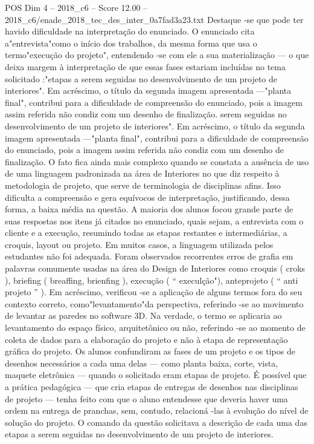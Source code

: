\begin{textsample}{POS Dim 4 – 2018\_c6 – Score 12.00 – 2018\_c6/enade\_2018\_tec\_des\_inter\_0a7fad3a23.txt}
Destaque -se que pode ter havido dificuldade na interpretação do enunciado.
O enunciado cita a"entrevista"como o início dos trabalhos, da mesma forma que usa o termo"execução do projeto", entendendo -se com ele a sua materialização — o que deixa margem à interpretação de que essas fases estariam incluídas no tema solicitado :"etapas a serem seguidas no desenvolvimento de um projeto de interiores".
Em acréscimo, o título da segunda imagem apresentada —"planta final", contribui para a dificuldade de compreensão do enunciado, pois a imagem assim referida não condiz com um desenho de finalização. serem seguidas no desenvolvimento de um projeto de interiores".
Em acréscimo, o título da segunda imagem apresentada —"planta final", contribui para a dificuldade de compreensão do enunciado, pois a imagem assim referida não condiz com um desenho de finalização.
O fato fica ainda mais complexo quando se constata a ausência de uso de uma linguagem padronizada na área de Interiores no que diz respeito à metodologia de projeto, que serve de terminologia de disciplinas afins.
Isso dificulta a compreensão e gera equívocos de interpretação, justificando, dessa forma, a baixa média na questão.
A maioria dos alunos focou grande parte de suas respostas nos itens já citados no enunciado, quais sejam, a entrevista com o cliente e a execução, resumindo todas as etapas restantes e intermediárias, a croquis, layout ou projeto.
Em muitos casos, a linguagem utilizada pelos estudantes não foi adequada.
Foram observados recorrentes erros de grafia em palavras comumente usadas na área do Design de Interiores como croquis ( croks ), briefing ( breaffing, brienfing ), execução ( “ execulção"), anteprojeto ( “ anti projeto ” ).
Em acréscimo, verificou -se a aplicação de alguns termos fora do seu contexto correto, como"levantamento"da perspectiva, referindo -se ao movimento de levantar as paredes no software 3D.
Na verdade, o termo se aplicaria ao levantamento do espaço físico, arquitetônico ou não, referindo -se ao momento de coleta de dados para a elaboração do projeto e não à etapa de representação gráfica do projeto.
Os alunos confundiram as fases de um projeto e os tipos de desenhos necessários a cada uma delas — como planta baixa, corte, vista, maquete eletrônica — quando o solicitado eram etapas de projeto.
É possível que a prática pedagógica — que cria etapas de entregas de desenhos nas disciplinas de projeto — tenha feito com que o aluno entendesse que deveria haver uma ordem na entrega de pranchas, sem, contudo, relacioná -las à evolução do nível de solução do projeto.
O comando da questão solicitava a descrição de cada uma das etapas a serem seguidas no desenvolvimento de um projeto de interiores.

\end{textsample}
